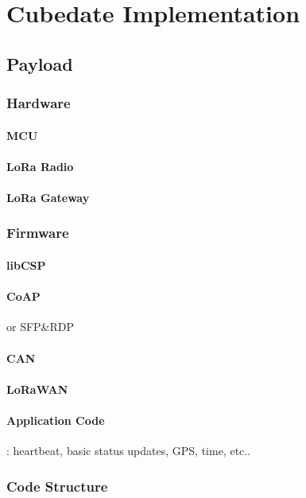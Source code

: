 \section{Cubedate Implementation}
\label{sec:implementation}

\subsection{Payload}
\label{sec:paylod}
\subsubsection{Hardware}
\paragraph*{MCU}
\paragraph*{LoRa Radio}
\paragraph*{LoRa Gateway}

\subsubsection{Firmware}
\paragraph*{libCSP}
\paragraph*{CoAP} or SFP\&RDP
\paragraph*{CAN}
\paragraph*{LoRaWAN}
\paragraph*{Application Code}: heartbeat, basic status updates, GPS, time, etc..
\subsubsection{Code Structure}

